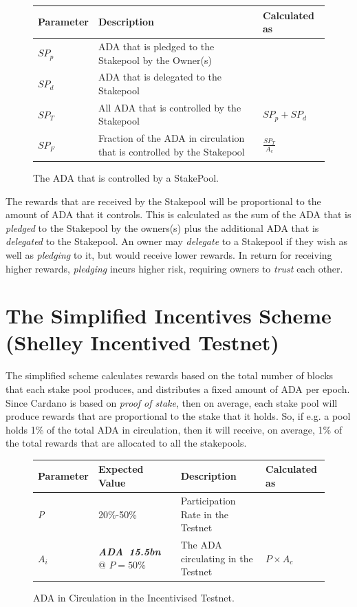 \documentclass[11pt,a4paper,dvipsnames,twosided]{article}
\newcommand{\ada}{ADA{}}
\newcommand{\ADA}[1]{\textbf{\emph{\ada~{#1}}}}
\newcommand{\cardano}[1]{Cardano}
\begin{document}
\begin{figure}[h!]
\begin{center}
\begin{tabular}{||l|p{6cm}|l||}
  \hline \hline
\textbf{Parameter} & \textbf{Description} & \textbf{Calculated as} \\\hline
$SP_p$ & \ada{} that is pledged to the Stakepool by the Owner(s) & \\\hline
$SP_d$ & \ada{} that is delegated to the Stakepool & \\\hline
$SP_T$ & All \ada{} that is controlled by the Stakepool & $SP_p + SP_d$ \\\hline
$SP_F$ & Fraction of the \ada{} in circulation that is controlled by the Stakepool & {\large $\frac{SP_T}{A_c}$} \\\hline
\end{tabular}
\end{center}
\caption{The \ada{} that is controlled by a StakePool.}
\end{figure}

\noindent
The rewards that are received by the Stakepool will be proportional to the amount of \ada{} that it controls.
This is calculated as the sum of the \ada{} that is \emph{pledged} to the Stakepool by the owners(s) plus
the additional \ada{} that is \emph{delegated} to the Stakepool.  An owner may \emph{delegate} to a Stakepool if
they wish as well as \emph{pledging} to it, but would receive lower rewards.  In return for receiving
higher rewards, \emph{pledging} incurs higher risk, requiring owners to \emph{trust} each other.


\section{The Simplified Incentives Scheme (Shelley Incentived Testnet)}
\label{sec:testnet}

The simplified scheme calculates rewards based on the total number of blocks that each stake pool produces,
and distributes a fixed amount of \ada{} per epoch.
Since \cardano{} is based on \emph{proof of stake}, then on average, each stake pool will produce
rewards that are proportional to the stake that it holds.  So, if e.g. a pool holds 1\% of the total
\ada{} in circulation, then it will receive, on average, 1\% of the total rewards that are allocated to all the
stakepools.

\begin{figure}[h!]
\begin{center}
\begin{tabular}{||l|l|p{6cm}|l||}
  \hline \hline
\textbf{Parameter} & \textbf{Expected Value} & \textbf{Description} & \textbf{Calculated as} \\\hline
\emph{P} & 20\%-50\% & Participation Rate in the Testnet & \\\hline
$A_i$ & \ADA{15.5bn} @ $P=50\%$ & The \ada{} circulating in the Testnet & $P \times A_c$ \\\hline
\end{tabular}
\end{center}
\caption{\ada{} in Circulation in the Incentivised Testnet.}
\end{figure}
\end{document}
